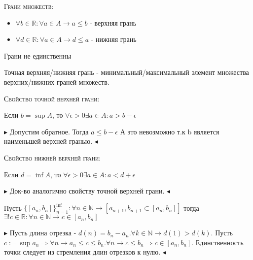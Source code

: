 \documentclass[14pt]{extreport}
\begin{document}
        \textsc{Грани множеств:}

        \begin{itemize}
            \item $\forall b \in \mathbb{R}:\forall a \in A \rightarrow a \leq b$ - верхняя грань 
            \item $\forall d \in \mathbb{R}:\forall a \in A \rightarrow d \leq a$ - нижняя грань 
        \end{itemize}

            Грани не единственны

        \begin{definition}
            Точная верхняя/нижняя грань - минимальный/максимальный элемент множества верхних/нижних граней множеств. 
        \end{definition}


        \textsc{Свойство точной верхней грани:}

        Если $ b = \sup A$, то $\forall \epsilon > 0 \exists a \in A: a > b - \epsilon$

        $\blacktriangleright$
            Допустим обратное. Тогда $a \leq b - \epsilon$ А это невозможно т.к b является наименьшей верхней гранью.
        $\blacktriangleleft$
    
        \textsc{Свойство нижней верхней грани:}

        Если $ d = \inf A$, то $\forall \epsilon > 0 \exists a \in A: a < d + \epsilon$

        $\blacktriangleright$
            Док-во аналогично свойству точной верхней грани. 
        $\blacktriangleleft$

        \begin{theorem}
            Пусть $\{[a_n, b_n]\}^{\inf}_{n=1}: \forall n \in \mathbb{N} \rightarrow [a_{n+1}, b_{n+1} \subset [a_n, b_n]]$ тогда $\exists ! c \in \mathbb{R}: \forall n \in \mathbb{N} \rightarrow c \in [a_n, b_n]$
        \end{theorem}
        $\blacktriangleright$
            Пусть длина отрезка - $d(n) = b_n - a_n. \forall k \in \mathbb{N} \rightarrow d(1) > d(k)$. Пусть $c := \sup a_n \Rightarrow \forall n \rightarrow a_n \leq c \leq b_n. \forall n \rightarrow c \leq b_n \Rightarrow c \in [a_n, b_n]$. Единственность точки следует из стремления длин отрезков к нулю.
        $\blacktriangleleft$
\end{document}
